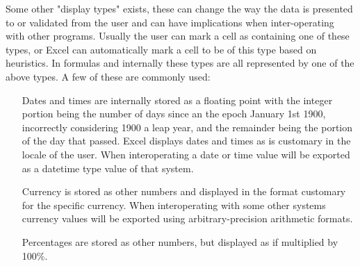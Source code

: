 Some other "display types" exists, these can change the way the data is presented to or validated from the user and can have implications when inter-operating with other programs.
Usually the user can mark a cell as containing one of these types, or Excel can automatically mark a cell to be of this type based on heuristics.
In formulas and internally these types are all represented by one of the above types.
A few of these are commonly used:
\begin{itemize}
\item[Dates and times] are internally stored as a floating point with the integer portion being the number of days since an the epoch January 1st 1900, incorrectly considering 1900 a leap year, and the remainder being the portion of the day that passed.
Excel displays dates and times as is customary in the locale of the user.
When interoperating a date or time value will be exported as a datetime type value of that system.
\item[Currency] is stored as other numbers and displayed in the format customary for the specific currency. When interoperating with some other systems currency values will be exported using arbitrary-precision arithmetic formats.
\item[Percentages] are stored as other numbers, but displayed as if multiplied by 100\%.
\end{itemize}
